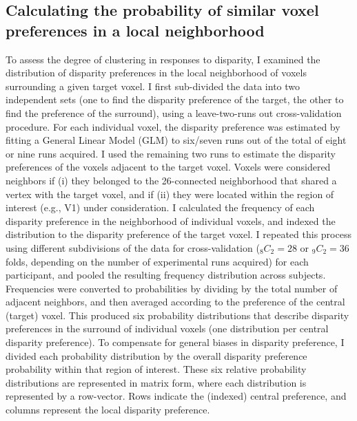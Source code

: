 \subsection{Calculating the probability of similar voxel preferences in a local neighborhood}
To assess the degree of clustering in responses to disparity, I examined the distribution of disparity preferences in the local neighborhood of voxels surrounding a given target voxel. I first sub-divided the data into two independent sets (one to find the disparity preference of the target, the other to find the preference of the surround), using a leave-two-runs out cross-validation procedure. For each individual voxel, the disparity preference was estimated by fitting a General Linear Model (GLM) to six/seven runs out of the total of eight or nine runs acquired. I used the remaining two runs to estimate the disparity preferences of the voxels adjacent to the target voxel. Voxels were considered neighbors if (i) they belonged to the 26-connected neighborhood that shared a vertex with the target voxel, and if (ii) they were located within the region of interest (e.g., V1) under consideration. I calculated the frequency of each disparity preference in the neighborhood of individual voxels, and indexed the distribution to the disparity preference of the target voxel. I repeated this process using different subdivisions of the data for cross-validation ($_8C_2 = 28$ or $_9C_2 = 36$ folds, depending on the number of experimental runs acquired) for each participant, and pooled the resulting frequency distribution across subjects. Frequencies were converted to probabilities by dividing by the total number of adjacent neighbors, and then averaged according to the preference of the central (target) voxel. This produced six probability distributions that describe disparity preferences in the surround of individual voxels (one distribution per central disparity preference). To compensate for general biases in disparity preference, I divided each probability distribution by the overall disparity preference probability within that region of interest. These six relative probability distributions are represented in matrix form, where each distribution is represented by a row-vector. Rows indicate the (indexed) central preference, and columns represent the local disparity preference.

